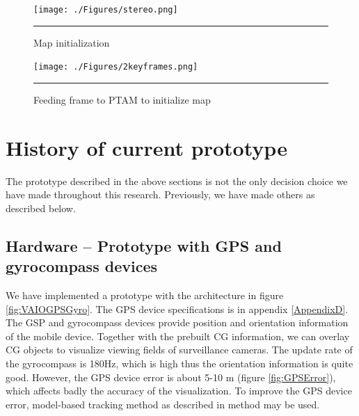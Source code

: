 \begin{figure}[htbp]
	\centering
	\texttt{[image: ./Figures/stereo.png]}
	\rule{35em}{0.5pt}
	\caption[Map initialization]{Map initialization}
	\label{fig:Stereo}
\end{figure}

\begin{figure}[htbp]
	\centering
	\texttt{[image: ./Figures/2keyframes.png]}
	\rule{35em}{0.5pt}
	\caption[Feeding frame to PTAM to initialize map]{Feeding frame to PTAM to initialize map}
	\label{fig:2KeyFrames}
\end{figure}


\section{History of current prototype}

The prototype described in the above sections is not the only decision choice we have made throughout this research. Previously, we have made others as described below.

\subsection{Hardware -- Prototype with GPS and gyrocompass devices}

We have implemented a prototype with the architecture in figure \ref{fig:VAIOGPSGyro}. The GPS device specifications is in appendix \ref{AppendixD}. The GSP and gyrocompass devices provide position and orientation information of the mobile device. Together with the prebuilt CG information, we can overlay CG objects to visualize viewing fields of surveillance cameras. The update rate of the gyrocompass is 180Hz, which is high thus the orientation information is quite good. However, the GPS device error is about 5-10 m (figure \ref{fig:GPSError}), which affects badly the accuracy of the visualization. To improve the GPS device error, model-based tracking method as described in \cite{Reference13} method may be used.

